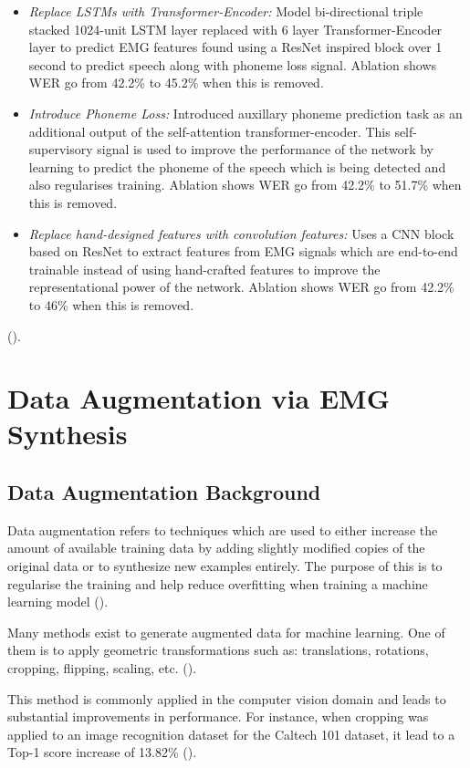 \begin{itemize}
  \item \emph{Replace LSTMs with Transformer-Encoder:}
  Model bi-directional triple stacked 1024-unit LSTM layer replaced with 6 layer Transformer-Encoder
  layer to predict EMG features found using a ResNet inspired block
  over 1 second to predict speech along with phoneme loss signal.
  Ablation shows WER go from 42.2\% to 45.2\% when this is removed.
  \item \emph{Introduce Phoneme Loss:}
  Introduced auxillary phoneme prediction task as an additional 
  output of the self-attention transformer-encoder. This self-supervisory 
  signal is used to improve the performance of the network by learning to 
  predict the phoneme of the speech which is being detected and
  also regularises training.
  Ablation shows WER go from 42.2\% to 51.7\% when this is removed.
  \item \emph{Replace hand-designed features with convolution features:}
  Uses a CNN block based on ResNet to extract features from EMG signals which are end-to-end
  trainable instead of using hand-crafted features to improve the representational power of the network.
  Ablation shows WER go from 42.2\% to 46\% when this is removed.
\end{itemize}
(\cite{gaddy2021improved}).

\section{Data Augmentation via EMG Synthesis}

\subsection{Data Augmentation Background}

Data augmentation refers to techniques which are used to either increase
the amount of available training data by adding slightly modified
copies of the original data or to synthesize new examples entirely.
The purpose of this is to regularise the training and help reduce overfitting
when training a machine learning model (\cite{data_augmentation_def}).

Many methods exist to generate augmented data for machine learning.
One of them is to apply geometric transformations such as: translations, rotations,
cropping, flipping, scaling, etc. (\cite{data_augmentation_def}).

This method is commonly applied in the computer vision domain and
leads to substantial improvements in performance. For instance,
when cropping was applied to an image recognition dataset for the
Caltech 101 dataset, it lead to a Top-1 score increase of 13.82\%
(\cite{geometric_augment}).

